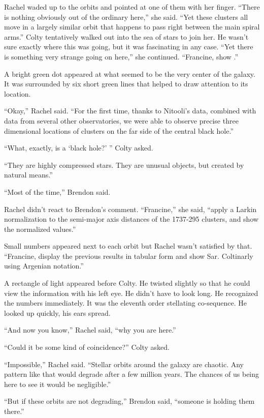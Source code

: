 Rachel waded up to the orbits and pointed at one of them with her finger. ``There is nothing
obviously out of the ordinary here,'' she said. ``Yet these clusters all move in a largely
similar orbit that happens to pass right between the main spiral arms.'' Colty tentatively
walked out into the sea of stars to join her. He wasn't sure exactly where this was going, but
it was fascinating in any case. ``Yet there is something very strange going on here,'' she
continued. ``Francine, show .''

A bright green dot appeared at what seemed to be the very center of the galaxy. It was
surrounded by six short green lines that helped to draw attention to its location.

``Okay,'' Rachel said. ``For the first time, thanks to Nitooli's data, combined with data from
several other observatories, we were able to observe precise three dimensional locations of
clusters on the far side of the central black hole.''

``What, exactly, is a `black hole?' '' Colty asked.

``They are highly compressed stars. They are unusual objects, but created by natural means.''

``Most of the time,'' Brendon said.

Rachel didn't react to Brendon's comment. ``Francine,'' she said, ``apply a Larkin normalization
to the semi-major axis distances of the 1737-295 clusters, and show the normalized values.''

Small numbers appeared next to each orbit but Rachel wasn't satisfied by that. ``Francine,
display the previous results in tabular form and show Sar. Coltinarly using Argenian notation.''

A rectangle of light appeared before Colty. He twisted slightly so that he could view the
information with his left eye. He didn't have to look long. He recognized the numbers
immediately. It was the eleventh order stellating co-sequence. He looked up quickly, his ears
spread.

``And now you know,'' Rachel said, ``why you are here.''

``Could it be some kind of coincidence?'' Colty asked.

``Impossible,'' Rachel said. ``Stellar orbits around the galaxy are chaotic. Any pattern like
that would degrade after a few million years. The chances of us being here to see it would be
negligible.''

``But if these orbits are not degrading,'' Brendon said, ``someone is holding them there.''

